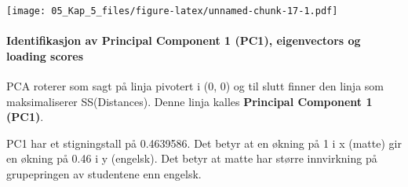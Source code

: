 \documentclass[
]{article}
\newenvironment{Shaded}{\begin{snugshade}}{\end{snugshade}}
\newcommand{\AttributeTok}[1]{\textcolor[rgb]{0.77,0.63,0.00}{#1}}
\newcommand{\CommentTok}[1]{\textcolor[rgb]{0.56,0.35,0.01}{\textit{#1}}}
\newcommand{\DecValTok}[1]{\textcolor[rgb]{0.00,0.00,0.81}{#1}}
\newcommand{\FloatTok}[1]{\textcolor[rgb]{0.00,0.00,0.81}{#1}}
\newcommand{\FunctionTok}[1]{\textcolor[rgb]{0.00,0.00,0.00}{#1}}
\newcommand{\NormalTok}[1]{#1}
\newcommand{\SpecialCharTok}[1]{\textcolor[rgb]{0.00,0.00,0.00}{#1}}
\newcommand{\StringTok}[1]{\textcolor[rgb]{0.31,0.60,0.02}{#1}}
\begin{document}
\texttt{[image: 05\_Kap\_5\_files/figure-latex/unnamed-chunk-17-1.pdf]}

\hypertarget{identifikasjon-av-principal-component-1-pc1-eigenvectors-og-loading-scores}{%
\paragraph{Identifikasjon av Principal Component 1 (PC1), eigenvectors og loading scores}\label{identifikasjon-av-principal-component-1-pc1-eigenvectors-og-loading-scores}}

PCA roterer som sagt på linja pivotert i (0, 0) og til slutt finner den linja som maksimaliserer SS(Distances). Denne linja kalles \textbf{Principal Component 1 (PC1)}.

PC1 har et stigningstall på 0.4639586. Det betyr at en økning på 1 i x (matte) gir en økning på 0.46 i y (engelsk). Det betyr at matte har større innvirkning på grupepringen av studentene enn engelsk.

\begin{Shaded}
\end{Shaded}
\end{document}
